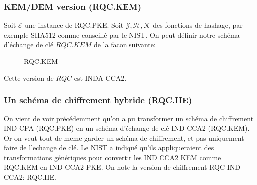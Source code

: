 \documentclass[12pt]{article}
\begin{document}
\subsubsection{KEM/DEM version (RQC.KEM)}
Soit $\mathcal{E}$ une instance de RQC.PKE. Soit $\mathcal{G}, \mathcal{H}, \mathcal{K}$ des fonctions de hashage, par exemple SHA512 comme conseillé par le NIST. On peut définir notre schéma d'échange de clé $RQC.KEM$ de la facon suivante:

\begin{figure}[h!]
    \centering
\noindent{}
    \caption{RQC.KEM}
    \label{fig:my_RQC.KEM}
\end{figure}

Cette version de $RQC $ est INDA-CCA2.

\subsubsection{Un schéma de chiffrement hybride (RQC.HE)}

On vient de voir précédemment qu'on a pu transformer un schéma de chiffrement IND-CPA (RQC.PKE) en un schéma d'échange de clé IND-CCA2 (RQC.KEM). Or on veut tout de meme garder un schéma de chiffrement, et pas uniquement faire de l'echange de clé. Le NIST a indiqué qu'ils appliqueraient des transformations génériques pour convertir les IND CCA2 KEM comme  RQC.KEM en IND CCA2 PKE. On note la version de chiffrement RQC IND CCA2: RQC.HE.
\end{document}
